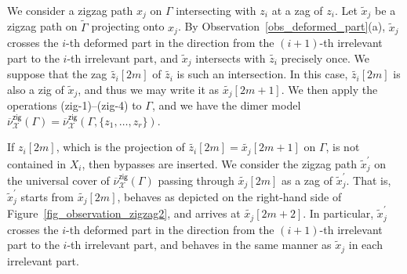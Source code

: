 \documentclass[pdftex]{sigma}%
\numberwithin{equation}{section}
\numberwithin{figure}{section}
\numberwithin{table}{section}
\newcommand{\calX}{\mathcal{X}}
\newcommand{\zig}{\mathsf{zig}}
\begin{document}
\begin{observation}
\label{obs_deformed_part3}
We consider a zigzag path $x_j$ on $\Gamma$ intersecting with $z_i$ at a zag of $z_i$.
Let $\widetilde{x}_j$ be a zigzag path on $\widetilde{\Gamma}$ projecting onto $x_j$.
By Observation~\ref{obs_deformed_part}(a), $\widetilde{x}_j$ crosses the $i$-th deformed part in the direction from the $(i+1)$-th irrelevant part to the $i$-th irrelevant part, and $\widetilde{x}_j$ intersects with $\widetilde{z_i}$ precisely once.
We suppose that the zag $\widetilde{z_i}[2m]$ of $\widetilde{z_i}$ is such an intersection.
In this case, $\widetilde{z_i}[2m]$ is also a zig of $\widetilde{x}_j$, and thus we may write it as $\widetilde{x_j}[2m+1]$.
We then apply the operations (zig-1)--(zig-4) to $\Gamma$, and we have the dimer model $\overline{\nu}_\calX^\zig(\Gamma)=\overline{\nu}_\calX^\zig(\Gamma,\{z_1,\dots,z_r\})$.

If $z_i[2m]$, which is the projection of $\widetilde{z_i}[2m]=\widetilde{x_j}[2m+1]$ on $\Gamma$, is not contained in $X_i$, then bypasses are inserted.
We consider the zigzag path $\widetilde{x}^\prime_j$ on the universal cover of $\overline{\nu}_\calX^\zig(\Gamma)$ passing through $\widetilde{x_j}[2m]$ as a zag of $\widetilde{x}^\prime_j$.
That is, $\widetilde{x}^\prime_j$ starts from $\widetilde{x_j}[2m]$, behaves as depicted on the right-hand side of Figure~\ref{fig_observation_zigzag2}, and arrives at $\widetilde{x_j}[2m+2]$.
In particular, $\widetilde{x}^\prime_j$ crosses the $i$-th deformed part in the direction from the $(i+1)$-th irrelevant part to the $i$-th irrelevant part,
and behaves in the same manner as $\widetilde{x}_j$ in each irrelevant part.

\begin{figure}[h!]\centering\vspace*{-31mm}
\end{figure}
\end{observation}
\end{document}
